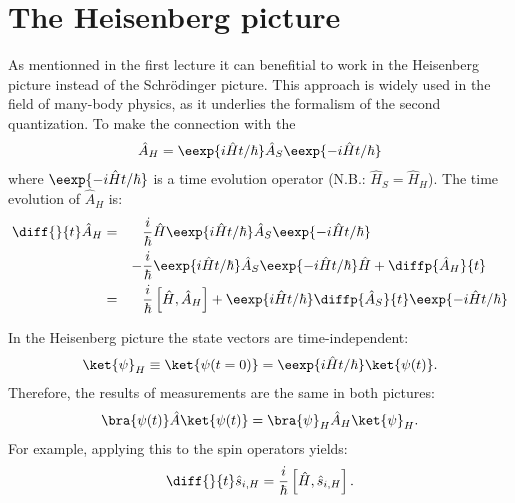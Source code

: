 \section{The Heisenberg picture}
As mentionned in the first lecture it can benefitial to work in the Heisenberg picture instead of the Schrödinger picture. This approach is widely used in the field of many-body physics, as it underlies the formalism of the second quantization. To make the connection with  the 
\begin{align}
    \hat{A}_H=\eexp{i{\hat{H} t}/{\hbar}} \hat{A}_S \eexp{-i{\hat{H} t}/{\hbar}}
\end{align}
					where $\eexp{-i{\hat{H} t}/{\hbar}}$ is a time evolution operator (N.B.: $\hat{H}_S = \hat{H}_H$). The time evolution of $\hat{A}_H$ is:
					\begin{align}
						\notag \diff{}{t} \hat{A}_H &=&& \frac{i}{\hbar}\hat{H}\eexp{i{\hat{H}t}/{\hbar}}\hat{A}_S \eexp{-i{\hat{H} t}/{\hbar}}\\ 
						&&-&\frac{i}{\hbar} \eexp{i{\hat{H} t}/{\hbar}}\hat{A}_S \eexp{-i{\hat{H}t}/{\hbar}}\hat{H}+\diffp{\hat{A}_H}{t}\\
						&=&& \frac{i}{\hbar}\left[\hat{H},\hat{A}_H\right] + \eexp{i{\hat{H}t}/{\hbar}}\diffp{\hat{A}_S}{t}\eexp{-i{\hat{H}t}/{\hbar}}
					\end{align}

					In the Heisenberg picture the state vectors are time-in\-de\-pen\-dent:
					\begin{align}
						\ket{\psi}_H \equiv \ket{\psi(t=0)}=\eexp{i{\hat{H}}t/{\hbar}} \ket{\psi(t)}.
					\end{align}
					Therefore, the results of measurements are the same in both pictures:
					\begin{align}
						\bra{\psi(t)}\hat{A}\ket{\psi(t)} = \bra{\psi}_H \hat{A}_H \ket{\psi}_H.
					\end{align}
					For example, applying this to the spin operators yields:
					\begin{align}
						\diff{}{t}\hat{s}_{i,H}=\frac{i}{\hbar}\left[\hat{H},\hat{s}_{i,H}\right].
					\end{align}
